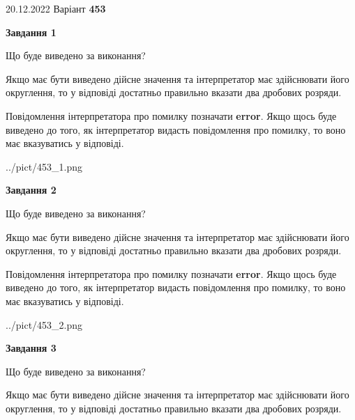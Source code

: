 \documentclass[12pt, ukrainian]{article}
\begin{document}
{20.12.2022 Варіант \No \textbf { 453 }\par}
{
\begin {Large}

{\begin {center}\textbf{Завдання 1}\end {center}}\par
Що буде виведено за виконання? \par

Якщо має бути виведено дійсне значення та інтерпретатор має здійснювати його округлення, 
то у відповіді достатньо правильно вказати два дробових розряди.

Повідомлення інтерпретатора про помилку позначати \textbf{error}.
Якщо щось буде виведено до того, як інтерпретатор видасть повідомлення про помилку, 
то воно має вказуватись у відповіді. \par

\begin{center}
	{../pict/453_1.png}
\end{center}
\newpage

{\begin {center}\textbf{Завдання 2}\end {center}}\par
Що буде виведено за виконання? \par

Якщо має бути виведено дійсне значення та інтерпретатор має здійснювати його округлення, 
то у відповіді достатньо правильно вказати два дробових розряди.

Повідомлення інтерпретатора про помилку позначати \textbf{error}.
Якщо щось буде виведено до того, як інтерпретатор видасть повідомлення про помилку, 
то воно має вказуватись у відповіді. \par

\begin{center}
	{../pict/453_2.png}
\end{center}
\newpage

{\begin {center}\textbf{Завдання 3}\end {center}}\par
Що буде виведено за виконання? \par

Якщо має бути виведено дійсне значення та інтерпретатор має здійснювати його округлення, 
то у відповіді достатньо правильно вказати два дробових розряди.


\end{Large}}
\end{document}
